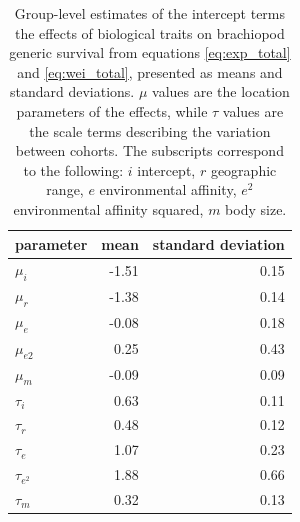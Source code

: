 \documentclass{article}
\begin{document}
\begin{table}
  \centering
  \begin{tabular}{ l r r }
    \hline
    parameter & mean & standard deviation \\ 
    \hline
    \(\mu_{i}\) & -1.51 & 0.15 \\ 
    \(\mu_{r}\) & -1.38 & 0.14 \\ 
    \(\mu_{e}\) & -0.08 & 0.18 \\ 
    \(\mu_{e2}\) & 0.25 & 0.43 \\ 
    \(\mu_{m}\) & -0.09 & 0.09 \\ 
    \(\tau_{i}\) & 0.63 & 0.11 \\ 
    \(\tau_{r}\) & 0.48 & 0.12 \\ 
    \(\tau_{e}\) & 1.07 & 0.23 \\ 
    \(\tau_{e^{2}}\) & 1.88 & 0.66 \\ 
    \(\tau_{m}\) & 0.32 & 0.13 \\ 
    \hline
  \end{tabular}
  \caption{Group-level estimates of the intercept terms the effects of biological traits on brachiopod generic survival from equations \ref{eq:exp_total} and \ref{eq:wei_total}, presented as means and standard deviations. \(\mu\) values are the location parameters of the effects, while \(\tau\) values are the scale terms describing the variation between cohorts. The subscripts correspond to the following: \(i\) intercept, \(r\) geographic range, \(e\) environmental affinity, \(e^{2}\) environmental affinity squared, \(m\) body size.}
  \label{tab:param}
\end{table}
\end{document}
